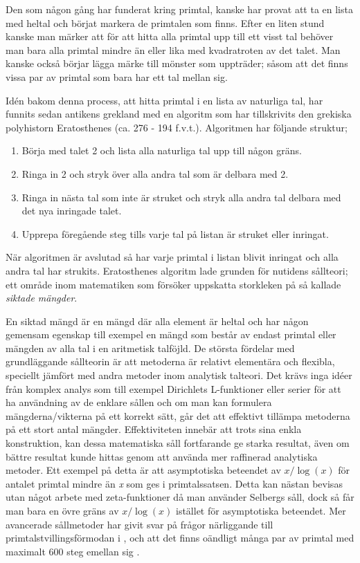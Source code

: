 Den som någon gång har funderat kring primtal, kanske har provat att ta en lista med heltal och börjat markera de primtalen som finns. 
Efter en liten stund kanske man märker att för att hitta alla primtal upp till ett visst tal behöver man bara alla primtal mindre än eller lika med kvadratroten av det talet. 
Man kanske också börjar lägga märke till mönster som uppträder; såsom att det finns vissa par av primtal som bara har ett tal mellan sig. 

Idén bakom denna process, att hitta primtal i en lista av naturliga tal, har funnits sedan antikens grekland med en algoritm som har tillskrivits den grekiska polyhistorn Eratosthenes (ca. 276 - 194 f.v.t.). Algoritmen har följande struktur;
\begin{enumerate}
    \item Börja med talet 2 och lista alla naturliga tal upp till någon gräns.
    \item Ringa in 2 och stryk över alla andra tal som är delbara med 2.
    \item Ringa in nästa tal som inte är struket och stryk alla andra tal delbara med det nya inringade talet.
    \item Upprepa föregående steg tills varje tal på listan är struket eller inringat. 
\end{enumerate}
När algoritmen är avslutad så har varje primtal i listan blivit inringat och alla andra tal har strukits. 
Eratosthenes algoritm lade grunden för nutidens sållteori; ett område inom matematiken som försöker uppskatta storkleken på så kallade \textit{siktade mängder}. 

En siktad mängd är en mängd där alla element är heltal och har någon gemensam egenskap till exempel en mängd som består av endast primtal eller mängden av alla tal i en aritmetisk talföjld.
De största fördelar med grundläggande sållteorin är att metoderna är relativt elementära och flexibla, speciellt jämfört med andra metoder inom analytisk talteori. 
Det krävs inga idéer från komplex analys som till exempel Dirichlets L-funktioner eller serier för att ha användning av de enklare sållen och om man kan formulera mängderna/vikterna på ett korrekt sätt, går det att effektivt tillämpa metoderna på ett stort antal mängder. 
Effektiviteten innebär att trots sina enkla konstruktion, kan dessa matematiska såll fortfarande ge starka resultat, även om bättre resultat kunde hittas genom att använda mer raffinerad analytiska metoder. 
Ett exempel på detta är att asymptotiska beteendet av \(x/\log(x)\) för antalet primtal mindre än \textit{x} som ges i primtalssatsen. 
Detta kan nästan bevisas utan något arbete med zeta-funktioner då man använder Selbergs såll, dock så får man bara en övre gräns av \(x/\log(x)\) istället för asymptotiska beteendet. 
Mer avancerade sållmetoder har givit svar på frågor närliggande till primtalstvillingsförmodan i \cite{chen2Prime}, och att det finns oändligt många par av primtal med maximalt 600 steg emellan sig \cite{mayBound}.


